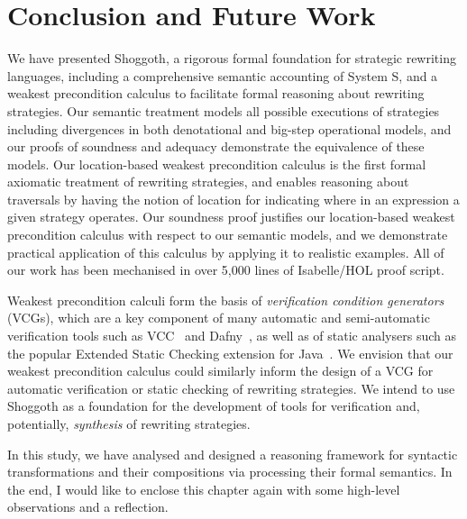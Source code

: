 \section{Conclusion and Future Work}
\label{chap4:conclusion-future-work}
We have presented Shoggoth, a rigorous formal foundation for strategic rewriting languages, including a comprehensive semantic accounting of System S, and a weakest precondition calculus to facilitate formal reasoning about rewriting strategies. Our semantic treatment models all possible executions of strategies including divergences in both denotational and big-step operational models, and our proofs of soundness and adequacy demonstrate the equivalence of these models. Our location-based weakest precondition calculus is the first formal axiomatic treatment of rewriting strategies, and enables reasoning about traversals by having the notion of location for indicating where in an expression a given strategy operates. Our soundness proof justifies our location-based weakest precondition calculus with respect to our semantic models, and we demonstrate practical application of this calculus by applying it to realistic examples. All of our work has been mechanised in over 5,000 lines of Isabelle/HOL proof script.

Weakest precondition calculi form the basis of \emph{verification condition generators} (VCGs), which are a key component of many automatic and semi-automatic verification tools such as VCC~\citep{DBLP:conf/tphol/CohenDHLMSST09} and Dafny~\citep{DBLP:conf/lpar/Leino10}, as well as of static analysers such as the popular Extended Static Checking extension for Java~\citep{DBLP:conf/pldi/FlanaganLLNSS02, DBLP:journals/ipl/Leino05}. We envision that our weakest precondition calculus could similarly inform the design of a VCG for automatic verification or static checking of rewriting strategies. We intend to use Shoggoth as a foundation for the development of tools for verification and, potentially, \emph{synthesis} of rewriting strategies.

\noindent
\begin{center}
\vspace{0.3em}
\vspace{-0.7em}
\end{center}
In this study, we have analysed and designed a reasoning framework for syntactic transformations and their compositions via processing their formal semantics. In the end, I would like to enclose this chapter again with some high-level observations and a reflection.


